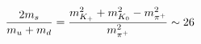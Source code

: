 \begin{equation}
{2 m_s\over m_u+m_d}=
{
m_{K_+}^2+m_{K_0}^2-m_{\pi^+}^2\over
m_{\pi^+}^2
}\sim 26
\end{equation}

